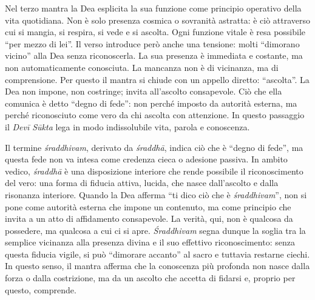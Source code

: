 Nel terzo mantra la Dea esplicita la sua funzione come principio operativo della vita quotidiana. Non è solo presenza cosmica o sovranità astratta: è ciò attraverso cui si mangia, si respira, si vede e si ascolta. Ogni funzione vitale è resa possibile “per mezzo di lei”. Il verso introduce però anche una tensione: molti “dimorano vicino” alla Dea senza riconoscerla. La sua presenza è immediata e costante, ma non automaticamente conosciuta. La mancanza non è di vicinanza, ma di comprensione. Per questo il mantra si chiude con un appello diretto: “ascolta”. La Dea non impone, non costringe; invita all’ascolto consapevole. Ciò che ella comunica è detto “degno di fede”: non perché imposto da autorità esterna, ma perché riconosciuto come vero da chi ascolta con attenzione. In questo passaggio il \textit{Devī Sūkta} lega in modo indissolubile vita, parola e conoscenza.

Il termine \textit{śraddhivam}, derivato da \textit{śraddhā}, indica ciò che è “degno di fede”, ma questa fede non va intesa come credenza cieca o adesione passiva. In ambito vedico, \textit{śraddhā} è una disposizione interiore che rende possibile il riconoscimento del vero: una forma di fiducia attiva, lucida, che nasce dall’ascolto e dalla risonanza interiore. Quando la Dea afferma “ti dico ciò che è \textit{śraddhivam}”, non si pone come autorità esterna che impone un contenuto, ma come principio che invita a un atto di affidamento consapevole. La verità, qui, non è qualcosa da possedere, ma qualcosa a cui ci si apre. \textit{Śraddhivam} segna dunque la soglia tra la semplice vicinanza alla presenza divina e il suo effettivo riconoscimento: senza questa fiducia vigile, si può “dimorare accanto” al sacro e tuttavia restarne ciechi. In questo senso, il mantra afferma che la conoscenza più profonda non nasce dalla forza o dalla costrizione, ma da un ascolto che accetta di fidarsi e, proprio per questo, comprende.